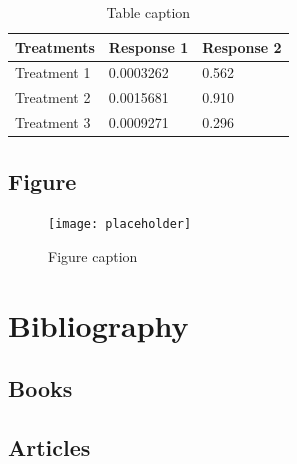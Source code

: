 \documentclass[11pt,fleqn,a5paper]{book} %
\begin{document}
    \begin{table}[h]
    \centering
    \begin{tabular}{l l l}
    \toprule
    \textbf{Treatments} & \textbf{Response 1} & \textbf{Response 2}\\
    \midrule
    Treatment 1 & 0.0003262 & 0.562 \\
    Treatment 2 & 0.0015681 & 0.910 \\
    Treatment 3 & 0.0009271 & 0.296 \\
    \bottomrule
    \end{tabular}
    \caption{Table caption}
    \end{table}
    
    
    \section{Figure}
    
    \begin{figure}[h]
    \centering\texttt{[image: placeholder]}
    \caption{Figure caption}
    \end{figure}
    
    
    \chapter*{Bibliography}
    \section*{Books}
    \printbibliography[heading=bibempty,type=book]
    \section*{Articles}
    \printbibliography[heading=bibempty,type=article]
    
    
    \cleardoublepage
    \setlength{\columnsep}{0.75cm}
    \printindex
    
\end{document}
